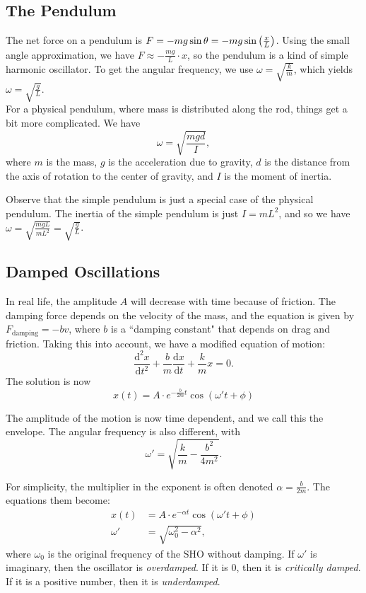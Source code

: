 \documentclass[class=article, crop=false]{standalone}
\begin{document}
  \subsection{The Pendulum}
  The net force on a pendulum is $F=-mg\sin\theta = -mg\sin \left( \frac{x}{L} \right)$. Using the small angle approximation, we have $F\approx-\frac{mg}{L}\cdot x$, so the pendulum is a kind of simple harmonic oscillator. To get the angular frequency, we use $\omega = \sqrt{\frac{k}{m}}$, which yields $\omega = \sqrt{\frac{g}{L}}$. \\[10pt]
  For a physical pendulum, where mass is distributed along the rod, things get a bit more complicated. We have
  \[
    \omega = \sqrt{\frac{mgd}{I}},
  \]
  where $m$ is the mass, $g$ is the acceleration due to gravity, $d$ is the distance from the axis of rotation to the center of gravity, and $I$ is the moment of inertia. 
  \begin{note}{}
    Observe that the simple pendulum is just a special case of the physical pendulum. The inertia of the simple pendulum is just $I=mL^2$, and so we have $\omega=\sqrt{\frac{mgL}{mL^2}}=\sqrt{\frac{g}{L}}$.
  \end{note}
  \subsection{Damped Oscillations}
  In real life, the amplitude $A$ will decrease with time because of friction. The damping force depends on the velocity of the mass, and the equation is given by $F_{\text{damping}} = -bv$, where $b$ is a ``damping constant" that depends on drag and friction. Taking this into account, we have a modified equation of motion:
  \[
    \frac{\mathrm{d}^2x}{\mathrm{d}t^2} + \frac{b}{m}\frac{\mathrm{d}x}{\mathrm{d}t} + \frac{k}{m}x = 0.
  \]
  The solution is now
  \[
    x(t) = A\cdot e^{-\frac{b}{2m}t}\cos(\omega't+\phi)
  \]
  \begin{note}{}
    The amplitude of the motion is now time dependent, and we call this the envelope. The angular frequency is also different, with
    \[
      \omega' = \sqrt{\frac{k}{m}-\frac{b^2}{4m^2}}\tag{$\omega' < \omega$}.
    \]
  \end{note}
  For simplicity, the multiplier in the exponent is often denoted $\alpha=\frac{b}{2m}$. The equations them become:
  \begin{align*}
    x(t) &= A\cdot e^{-\alpha t}\cos(\omega't + \phi) \\
    \omega' &= \sqrt{\omega_0^2-\alpha^2},
  \end{align*}
  where $\omega_0$ is the original frequency of the SHO without damping. If $\omega'$ is imaginary, then the oscillator is \emph{overdamped}. If it is $0$, then it is \emph{critically damped}. If it is a positive number, then it is \emph{underdamped}.
\end{document}
